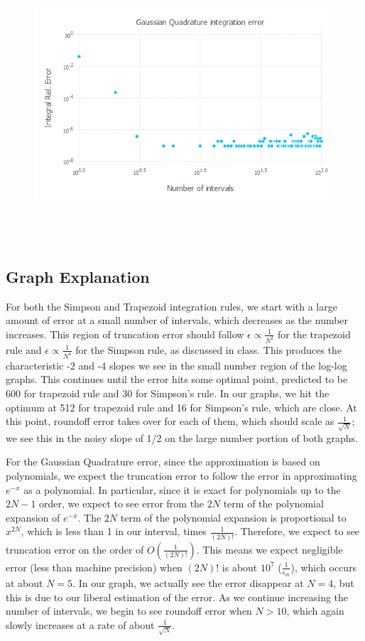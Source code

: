 \documentclass{article}
\begin{document}
\begin{figure}[H]
	\includegraphics[width=6in,height=4in]{"gauss"}
\end{figure}
\subsection{Graph Explanation}
For both the Simpson and Trapezoid integration rules, we start with a large amount of error at a small number of intervals, which decreases as the number increases. This region of truncation error should follow $\epsilon \propto \frac{1}{N^2}$  for the trapezoid rule and $\epsilon \propto \frac{1}{N^4}$ for the Simpson rule, as discussed in class. This produces the characteristic -2 and -4 slopes we see in the small number region of the log-log graphs. This continues until the error hits some optimal point, predicted to be 600 for trapezoid rule and 30 for Simpson's rule. In our graphs, we hit the optimum at 512 for trapezoid rule and 16 for Simpson's rule, which are close. At this point, roundoff error takes over for each of them, which should scale as $\frac{1}{\sqrt{N}}$; we see this in the noisy slope of 1/2 on the large number portion of both graphs.

For the Gaussian Quadrature error, since the approximation is based on polynomials, we expect the truncation error to follow the error in approximating $e^{-x}$ as a polynomial. In particular, since it is exact for polynomials up to the $2N-1$ order, we expect to see error from the $2N$ term of the polynomial expansion of $e^{-x}$. The $2N$ term of the polynomial expansion is proportional to $x^{2N}$, which is less than 1 in our interval, times $\frac{1}{(2N)!}$. Therefore, we expect to see truncation error on the order of $O(\frac{1}{(2N)!})$. This means we expect negligible error (less than machine precision) when $(2N)!$ is about $10^7$ ($\frac{1}{\epsilon_m}$), which occurs at about $N = 5$. In our graph, we actually see the error disappear at $N = 4$, but this is due to our liberal estimation of the error. As we continue increasing the number of intervals, we begin to see roundoff error when $N > 10$, which again slowly increases at a rate of about $\frac{1}{\sqrt{N}}$.
\end{document}
